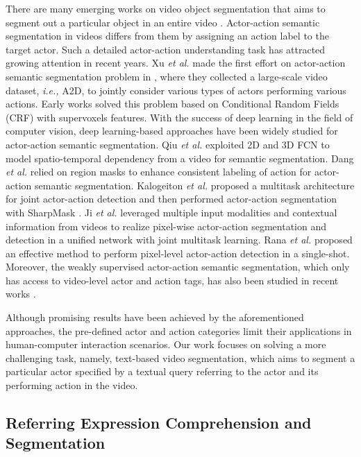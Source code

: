 \documentclass[journal]{IEEEtran}
\begin{document}
There are many emerging works on video object segmentation that aims to segment out a particular object in an entire video \cite{yao2020video}. Actor-action semantic segmentation in videos differs from them by assigning an action label to the target actor. Such a detailed actor-action understanding task has attracted growing attention in recent years. Xu \emph{et al.} made the first effort on actor-action semantic segmentation problem in \cite{xu2015can}, where they collected a large-scale video dataset, \emph{i.e.,} A2D, to jointly consider various types of actors performing various actions. Early works \cite{xu2015can,xu2016actor} solved this problem based on Conditional Random Fields (CRF) with supervoxels features. With the success of deep learning in the field of computer vision, deep learning-based approaches have been widely studied for actor-action semantic segmentation. Qiu \emph{et al.} \cite{qiu2017learning} exploited 2D and 3D FCN to model spatio-temporal dependency from a video for semantic segmentation. Dang \emph{et al.} \cite{dang2018actor} relied on region masks to enhance consistent labeling of action for actor-action semantic segmentation. Kalogeiton \emph{et al.} \cite{kalogeiton2017joint} proposed a multitask architecture for joint actor-action detection and then performed actor-action segmentation with SharpMask \cite{pinheiro2016learning}. Ji \emph{et al.} \cite{ji2018end} leveraged multiple input modalities and contextual information from videos to realize pixel-wise actor-action segmentation and detection in a unified network with joint multitask learning. Rana \emph{et al.} \cite{Rana_2021_WACV} proposed an effective method to perform pixel-level actor-action detection in a single-shot. Moreover, the weakly supervised actor-action semantic segmentation, which only has access to video-level actor and action tags, has also been studied in recent works \cite{yan2017weakly,Chen2020Learning}.

Although promising results have been achieved by the aforementioned approaches, the pre-defined actor and action categories limit their applications in human-computer interaction scenarios. Our work focuses on solving a more challenging task, namely, text-based video segmentation, which aims to segment a particular actor specified by a textual query referring to the actor and its performing action in the video.


\subsection{Referring Expression Comprehension and Segmentation}
\end{document}
